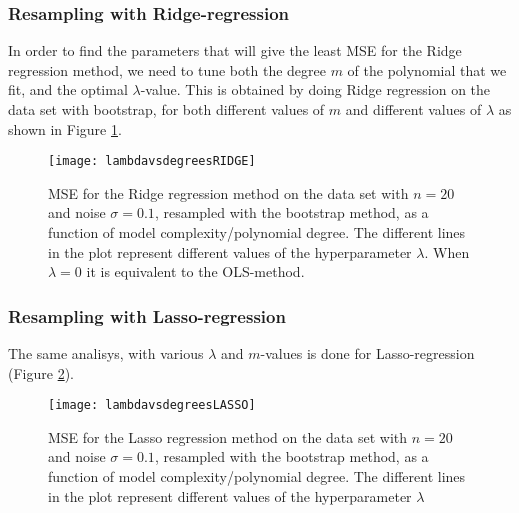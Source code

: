 \subsubsection{Resampling with Ridge-regression}
In order to find the parameters that will give the least MSE for the Ridge regression method, we need to tune both the degree $m$ of the polynomial that we fit, and the optimal $\lambda$-value. This is obtained by doing Ridge regression on the data set with bootstrap, for both different values of $m$ and different values of $\lambda$ as shown in Figure \ref{fig:lambdavsdegreesRIDGE}.

\begin{figure}[htbp]
	\centering
	\texttt{[image: lambdavsdegreesRIDGE]}
	\caption{MSE for the Ridge regression method on the data set with $n=20$ and noise $\sigma=0.1$, resampled with the bootstrap method, as a function of model complexity/polynomial degree. The different lines in the plot represent different values of the hyperparameter $\lambda$. When $\lambda=0$ it is equivalent to the OLS-method.}
	\label{fig:lambdavsdegreesRIDGE}
\end{figure}

\subsubsection{Resampling with Lasso-regression}
The same analisys, with various $\lambda$ and $m$-values is done for Lasso-regression (Figure \ref{fig:lambdavsdegreesLASSO}).
\begin{figure}[htbp]
	\centering
	\texttt{[image: lambdavsdegreesLASSO]}
	\caption{MSE for the Lasso regression method on the data set with $n=20$ and noise $\sigma=0.1$, resampled with the bootstrap method, as a function of model complexity/polynomial degree. The different lines in the plot represent different values of the hyperparameter $\lambda$}
	\label{fig:lambdavsdegreesLASSO}
\end{figure}

